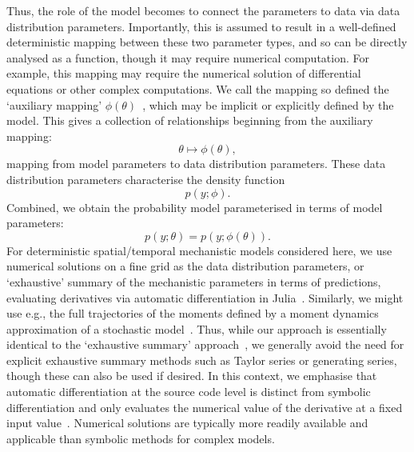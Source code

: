 Thus, the role of the model becomes to connect the parameters to data via data distribution parameters. Importantly, this is assumed to result in a well-defined deterministic mapping between these two parameter types, and so can be directly analysed as a function, though it may require numerical computation. For example, this mapping may require the numerical solution of differential equations or other complex computations. We call the mapping so defined the `auxiliary mapping' $\phi(\theta)$~\cite{Simpson2023}, which may be implicit or explicitly defined by the model. This gives a collection of relationships beginning from the auxiliary mapping:
\begin{equation}
\theta \mapsto \phi(\theta),
\end{equation}
mapping from model parameters to data distribution parameters. These data distribution parameters characterise the density function
\begin{equation}
p(y; \phi).
\end{equation}
Combined, we obtain the probability model parameterised in terms of model parameters:
\begin{equation}
p(y;\theta) = p(y;\phi(\theta)).
\end{equation}
For deterministic spatial/temporal mechanistic models considered here, we use numerical solutions on a fine grid as the data distribution parameters, or `exhaustive' summary of the mechanistic parameters in terms of predictions, evaluating derivatives via automatic differentiation in Julia~\cite{Revels2016}. Similarly, we might use e.g., the full trajectories of the moments defined by a moment dynamics approximation of a stochastic model~\cite{Browning2020}. Thus, while our approach is essentially identical to the `exhaustive summary' approach~\cite{Cole2010, Cole2020}, we generally avoid the need for explicit exhaustive summary methods such as Taylor series or generating series, though these can also be used if desired. In this context, we emphasise that automatic differentiation at the source code level is distinct from symbolic differentiation and only evaluates the numerical value of the derivative at a fixed input value~\cite{Griewank2008}. Numerical solutions are typically more readily available and applicable than symbolic methods for complex models.

